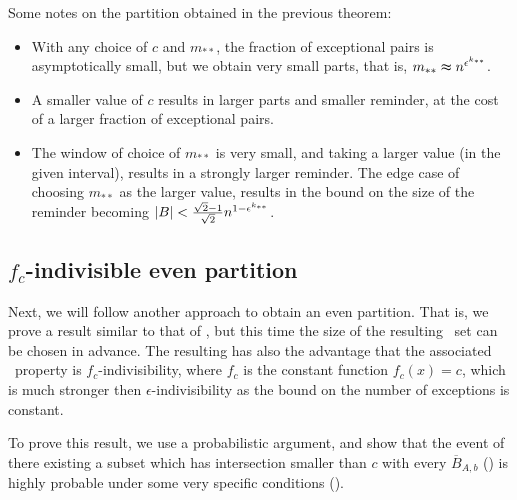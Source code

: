         \begin{remark}
            Some notes on the partition obtained in the previous theorem:
            \begin{itemize}
                \item With any choice of $c$ and $m_{**}$, the fraction of exceptional pairs is asymptotically small,
                    but we obtain very small parts, that is, $m_{**} \thickapprox n^{\epsilon^{k_{**}}}$.
                \item A smaller value of $c$ results in larger parts and smaller reminder, at the cost of a larger fraction
                    of exceptional pairs.
                \item The window of choice of $m_{**}$ is very small, and taking a larger value
                    (in the given interval), results in a strongly larger reminder.
                    The edge case of choosing $m_{**}$ as the larger value, results in the bound on the size of the
                    reminder becoming $| B | < \frac{\sqrt{2}-1}{\sqrt{2}} n^{1-\epsilon^{k_{**}}}$.
            \end{itemize}
        \end{remark}

    \subsection{$f_c$-indivisible even partition} \label{subsec:subsection_4.3}

        Next, we will follow another approach to obtain an even partition.
        That is, we prove a result similar to that of , but this time the size of the resulting
        \regular~set can be chosen in advance.
        The resulting  has also the advantage that
        the associated \regular~property is $f_c$-indivisibility, where $f_c$ is the constant function $f_c(x) = c$, which
        is much stronger then $\epsilon$-indivisibility as the bound on the number of exceptions is constant.

        To prove this result, we use a probabilistic argument, and show that the event of there existing a subset which has
        intersection smaller than $c$ with every $\overline{B}_{A,b}$ () is highly
        probable under some very specific conditions ().

